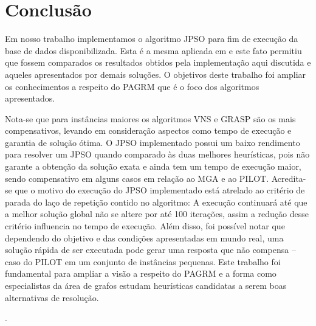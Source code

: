 \documentclass{sig-alternate-05-2015}
\begin{document}
 
\section{Conclusão} \label{sec6}
Em nosso trabalho implementamos o algoritmo JPSO para fim de execução da base de dados disponibilizada. Esta é a mesma aplicada em \cite{} e este fato permitiu que fossem comparados os resultados obtidos pela implementação aqui discutida e aqueles apresentados por demais soluções. O objetivos deste trabalho foi ampliar os conhecimentos a respeito do PAGRM que é o foco dos algoritmos apresentados. 

Nota-se que para instâncias maiores os algoritmos VNS e GRASP são os mais compensativos, levando em consideração aspectos como tempo de execução e garantia de solução ótima. O JPSO implementado possui um baixo rendimento para resolver um JPSO quando comparado às duas melhores heurísticas, pois não garante a obtenção da solução exata e ainda tem um tempo de execução maior, sendo compensativo em alguns casos em relação ao MGA e ao PILOT.  Acredita-se que o motivo do execução do JPSO implementado está atrelado ao critério de parada do laço de repetição contido no algoritmo: A execução continuará até que a melhor solução global não se altere por até 100 iterações, assim a redução desse critério influencia no tempo de execução. Além disso, foi possível notar que dependendo do objetivo e das condições apresentadas em mundo real, uma solução rápida de ser executada pode gerar uma resposta que não compensa -- caso do PILOT em um conjunto de instâncias pequenas. Este trabalho foi fundamental para ampliar a visão a respeito do PAGRM e a forma como especialistas da área de grafos estudam heurísticas candidatas a serem boas alternativas de resolução.

.

%

%
%
\end{document}
